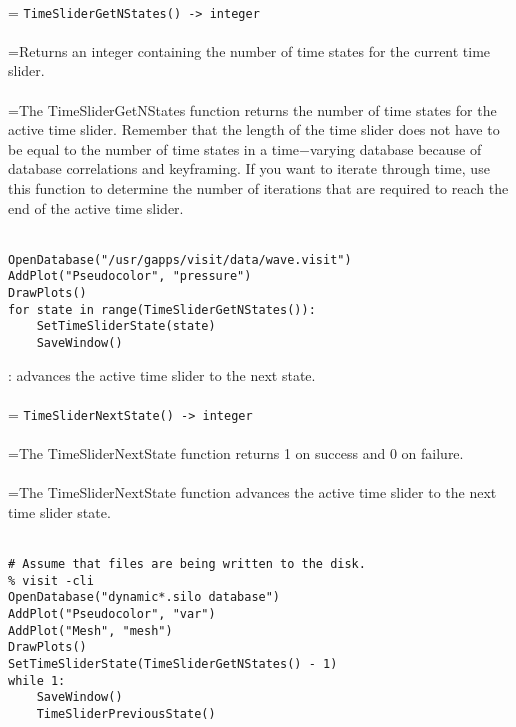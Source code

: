 \documentclass[10pt,a4paper]{report}
\begin{document}
 \\ 
\hangindent=\parindent 
\verb!TimeSliderGetNStates() -> integer!\\ [-3mm]

 \\ 
\hangindent=\parindent Returns an integer containing the number of time states for the current time slider. \\[-3mm] 

 \\ 
\hangindent=\parindent The TimeSliderGetNStates function returns the number of time states for the active time slider. Remember that the length of the time slider does not have to be equal to the number of time states in a time$-$varying database because of database correlations and keyframing. If you want to iterate through time, use this function to determine the number of iterations that are required to reach the end of the active time slider. \\[-3mm] 

\\[-6mm]
\begin{verbatim}OpenDatabase("/usr/gapps/visit/data/wave.visit")
AddPlot("Pseudocolor", "pressure")
DrawPlots()
for state in range(TimeSliderGetNStates()):
    SetTimeSliderState(state)
    SaveWindow()
\end{verbatim}
\newpage


{}
: advances the active time slider to the next state.\\[-3mm]

 \\ 
\hangindent=\parindent 
\verb!TimeSliderNextState() -> integer!\\ [-3mm]

 \\ 
\hangindent=\parindent The TimeSliderNextState function returns 1 on success and 0 on failure. \\[-3mm] 

 \\ 
\hangindent=\parindent The TimeSliderNextState function advances the active time slider to the next time slider state. \\[-3mm] 

\\[-6mm]
\begin{verbatim}# Assume that files are being written to the disk.
% visit -cli
OpenDatabase("dynamic*.silo database")
AddPlot("Pseudocolor", "var")
AddPlot("Mesh", "mesh")
DrawPlots()
SetTimeSliderState(TimeSliderGetNStates() - 1)
while 1:
    SaveWindow()
    TimeSliderPreviousState()
\end{verbatim}
\newpage
\end{document}

